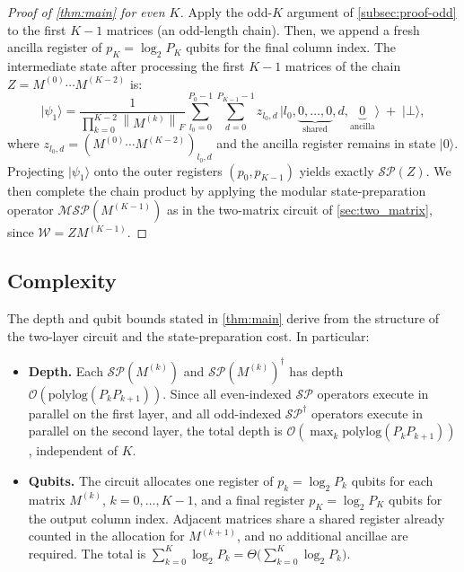 \documentclass[a4paper,UKenglish,cleveref,autoref,thm-restate]{socg-lipics-v2021}
\providecommand{\ket}[1]{\lvert #1 \rangle}
\newcommand{\norm}[1]{\left\| #1 \right\|}
\newcommand{\SP}{\mathcal{SP}}        %
\newcommand{\MSP}{\mathcal{MSP}} %
\begin{document}
\begin{proof}[Proof of \cref{thm:main} for even $K$]\label{subsec:proof-even}
Apply the odd-$K$ argument of \cref{subsec:proof-odd} to the first $K-1$
matrices (an odd-length chain).
Then, we append a fresh ancilla register of $p_K=\log_2 P_K$ qubits for the
final column index.
The intermediate state after processing the first $K-1$ matrices of the chain $Z= M^{(0)}\cdots M^{(K-2)}$ is:
\begin{equation*}\label{eq:psi-half}
  \ket{\psi_{1}}
  = \frac{1}{\prod_{k=0}^{K-2}\norm{M^{(k)}}_F}
    \sum_{l_0=0}^{P_0-1}\sum_{d=0}^{P_{K-1}-1}
    z_{l_0,d}\,
\ket{l_0,\underbrace{0,\ldots,0}_{\text{shared}},d,\underbrace{0}_{\text{ancilla}}}
    \;+\; \ket{\bot},
\end{equation*}
where $z_{l_0,d} = (M^{(0)}\cdots M^{(K-2)})_{l_0,d}$ and the ancilla register remains in state $\ket{0}$. Projecting $\ket{\psi_{1}}$ onto the outer registers $(p_0, p_{K-1})$ yields exactly $\SP(Z)$. We then complete the chain product by applying the modular state-preparation operator $\MSP(M^{(K-1)})$ as in the two-matrix circuit of \cref{sec:two_matrix}, since $\mathcal{W} = Z M^{(K-1)}$.
\end{proof}


\subsection{Complexity}\label{subsec:complexity-analysis}
The depth and qubit bounds stated in \cref{thm:main} derive from the structure of the two-layer circuit and the state-preparation cost. In particular:

\begin{itemize}
  \item \textbf{Depth.} Each $\SP(M^{(k)})$ and $\SP(M^{(k)})^\dagger$ has depth $\mathcal{O}({\mathrm {polylog}}(P_kP_{k+1}))$. Since all even-indexed $\SP$ operators execute in parallel on the first layer, and all odd-indexed $\SP^\dagger$ operators execute in parallel on the second layer, the total depth is $\mathcal{O}(\max_{k} {\mathrm {polylog}}(P_k P_{k+1}))$, independent of $K$.
  \item \textbf{Qubits.} The circuit allocates one register of $p_k=\log_2 P_k$ qubits for each matrix $M^{(k)}$, $k=0,\ldots,K-1$, and a final register  $p_K=\log_2 P_K$ qubits for the output column index. Adjacent matrices share a shared register already counted in the allocation for $M^{(k+1)}$, and no additional ancillae are required. The total is $\sum_{k=0}^{K} \log_2 P_k = \Theta\!\bigl(\sum_{k=0}^{K} \log_2 P_k \bigr)$.   
\end{itemize}
\end{document}
